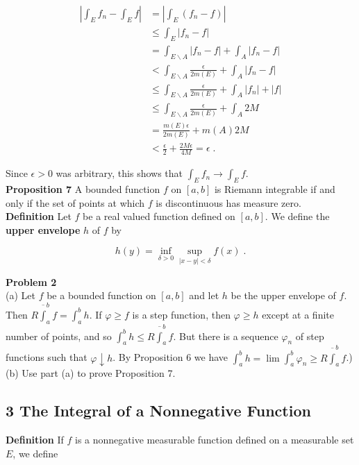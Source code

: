 \documentclass[a4paper]{article}
\begin{document}
\begin{align*}
|\int_E f_n - \int_E f| &=  |\int_E (f_n - f)|\\
&\leq \int_E |f_n - f| \\
&= \int_{E\backslash A} |f_n - f| + \int_{A} |f_n - f| \\
&< \int_{E \backslash A} \frac{\epsilon}{2m(E)} + \int_{A} |f_n - f| \\
&\leq \int_{E \backslash A} \frac{\epsilon}{2m(E)} + \int_{A} |f_n| + |f| \\
&\leq \int_{E \backslash A} \frac{\epsilon}{2m(E)} + \int_{A} 2M \\ 
&= \frac{m(E)\epsilon}{2m(E)} +  m(A)2M \\
&< \frac{\epsilon}{2} + \frac{2M \epsilon}{4M} = \epsilon \;.
\end{align*} 

Since $\epsilon > 0$ was arbitrary, this shows that $\int_E f_n \rightarrow \int_E f$. \\

{\bf Proposition 7} A bounded function $f$ on $[a,b]$ is Riemann integrable if and only if the set of points at which $f$ is discontinuous has measure zero.\\

{\bf Definition} Let $f$ be a real valued function defined on $[a,b]$. We define the {\bf upper envelope} $h$ of $f$ by

$$ h(y) = \inf_{\delta > 0} \sup_{|x-y| < \delta} f(x) \;.$$

{\bf Problem 2}\\

(a) Let $f$ be a bounded function on $[a,b]$ and let $h$ be the upper envelope of $f$. Then $R \overline{\int}_a^b f = \int_a^b h$. If $\varphi \geq f$ is a step function, then $\varphi \geq h$ except at a finite number of points, and so $\int_a^b h \leq R \overline{\int}_a^b f$. But there is a sequence $\varphi_n$ of step functions such that $\varphi \downarrow h$. By Proposition 6 we have $\int_a^b h = \lim \int_a^b \varphi_n \geq R\overline{\int}_a^b f$.) \\

(b) Use part (a) to prove Proposition 7. 

\subsection*{3 The Integral of a Nonnegative Function}

{\bf Definition} If $f$ is a nonnegative measurable function defined on a measurable set $E$, we define
\end{document}
